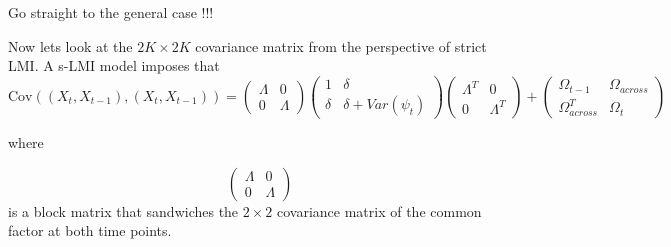 \documentclass[
  letterpaper,
  DIV=11,
  numbers=noendperiod]{scrartcl}
\begin{document}
Go straight to the general case !!!

Now lets look at the \(2K\times 2K\) covariance matrix from the
perspective of strict LMI. A s-LMI model imposes that \[
\text{Cov}((X_{t},X_{t-1}),(X_{t},X_{t-1}))= \begin{pmatrix}    \Lambda & 0
\\   0 & \Lambda \end{pmatrix}  \begin{pmatrix}   1 & \delta 
\\   \delta & \delta+Var(\psi_t) \end{pmatrix} \begin{pmatrix}    \Lambda^T & 0
\\   0 & \Lambda^T \end{pmatrix} + \begin{pmatrix}   \Omega_{t-1} & \Omega_{across} 
\\   \Omega_{across}^T & \Omega_t \end{pmatrix} 
\]

where

\[\begin{pmatrix}    \Lambda & 0\\   0 & \Lambda \end{pmatrix}\] is a
block matrix that sandwiches the \(2\times2\) covariance matrix of the
common factor at both time points.
\end{document}
